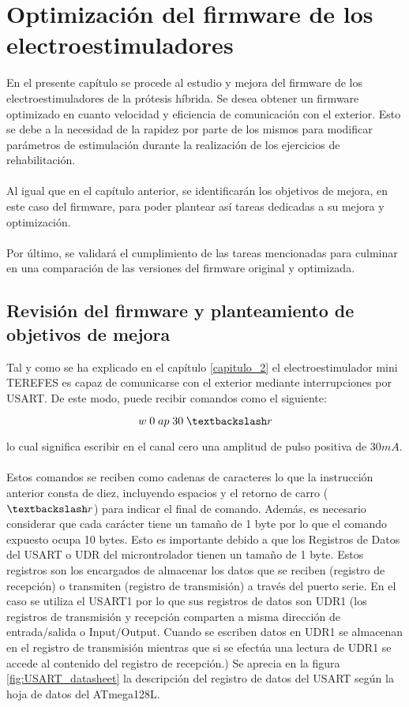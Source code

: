 \chapter{Optimización del firmware de los electroestimuladores}
En el presente capítulo se procede al estudio y mejora del firmware de los electroestimuladores de la prótesis híbrida. Se desea obtener un firmware optimizado en cuanto velocidad y eficiencia de comunicación con el exterior. Esto se debe a la necesidad de la rapidez por parte de los mismos para modificar parámetros de estimulación durante la realización de los ejercicios de rehabilitación.
\\
\\
Al igual que en el capítulo anterior, se identificarán los objetivos de mejora, en este caso del firmware, para poder plantear así tareas dedicadas a su mejora y optimización.
\\
\\
Por último, se validará el cumplimiento de las tareas mencionadas para culminar en una comparación de las versiones del firmware original y optimizada.

\section{Revisión del firmware y planteamiento de objetivos de mejora}
Tal y como se ha explicado en el capítulo \ref{capitulo_2} el electroestimulador mini TEREFES es capaz de comunicarse con el exterior mediante interrupciones por USART. De este modo, puede recibir comandos como el siguiente:

$$w\;0\;ap\;30\;\textbackslash r$$

lo cual significa escribir en el canal cero una amplitud de pulso positiva de 30$mA$.
\\
\\
Estos comandos se reciben como cadenas de caracteres lo que la instrucción anterior consta de diez, incluyendo espacios y el retorno de carro ($\textbackslash r$) para indicar el final de comando. Además, es necesario considerar que cada carácter tiene un tamaño de 1 byte por lo que el comando expuesto ocupa 10 bytes. Esto es importante debido a que los Registros de Datos del USART o UDR del microntrolador tienen un tamaño de 1 byte. Estos registros son los encargados de almacenar los datos que se reciben (registro de recepción) o transmiten (registro de transmisión) a través del puerto serie. En el caso se utiliza el USART1 por lo que sus registros de datos son UDR1 (los registros de transmisión y recepción comparten a misma dirección de entrada/salida o Input/Output. Cuando se escriben datos en UDR1 se almacenan en el registro de transmisión mientras que si se efectúa una lectura de UDR1 se accede al contenido del registro de recepción.) Se aprecia en la figura \ref{fig:USART_datasheet} la descripción del registro de datos del USART según la hoja de datos del ATmega128L.\\

